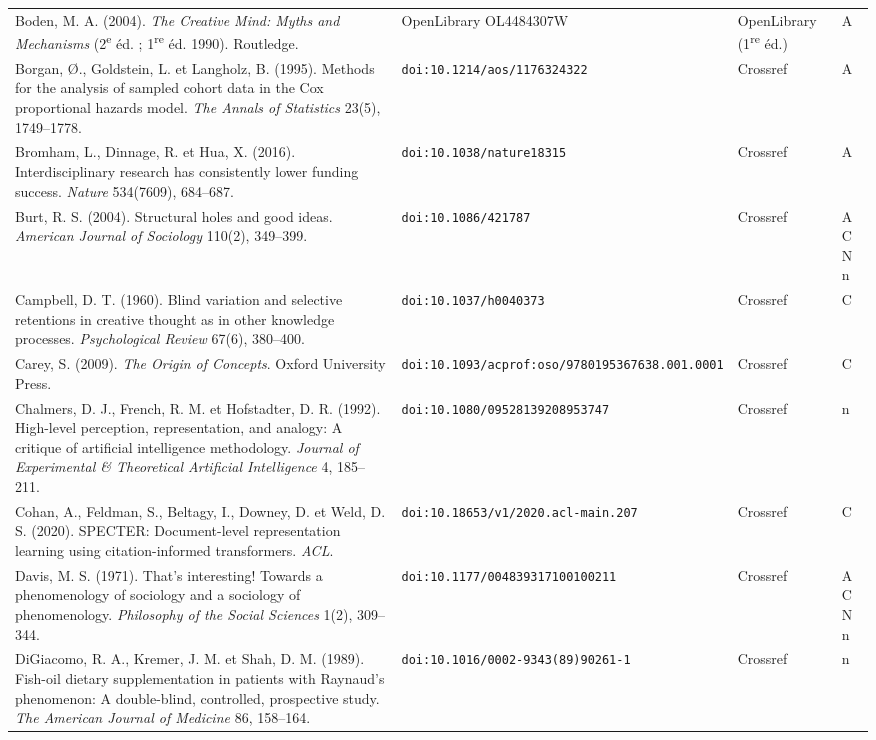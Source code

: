 \documentclass[a4paper,11pt]{article}
\begin{document}
{\begin{longtable}{@{}>{\raggedright\arraybackslash}p{8.7cm}>{\raggedright\arraybackslash}p{3.6cm}>{\raggedright\arraybackslash}p{2.1cm}>{\raggedright\arraybackslash}p{0.9cm}@{}}
Boden, M. A. (2004). \emph{The Creative Mind: Myths and Mechanisms} (2\textsuperscript{e} éd. ; 1\textsuperscript{re} éd. 1990). Routledge. & OpenLibrary OL4484307W & OpenLibrary (1\textsuperscript{re} éd.) & A\\
Borgan, Ø., Goldstein, L. et Langholz, B. (1995). Methods for the analysis of sampled cohort data in the Cox proportional hazards model. \emph{The Annals of Statistics} 23(5), 1749--1778. & \nolinkurl{doi:10.1214/aos/1176324322} & Crossref & A\\
Bromham, L., Dinnage, R. et Hua, X. (2016). Interdisciplinary research has consistently lower funding success. \emph{Nature} 534(7609), 684--687. & \nolinkurl{doi:10.1038/nature18315} & Crossref & A\\
Burt, R. S. (2004). Structural holes and good ideas. \emph{American Journal of Sociology} 110(2), 349--399. & \nolinkurl{doi:10.1086/421787} & Crossref & A C N n\\
Campbell, D. T. (1960). Blind variation and selective retentions in creative thought as in other knowledge processes. \emph{Psychological Review} 67(6), 380--400. & \nolinkurl{doi:10.1037/h0040373} & Crossref & C\\
Carey, S. (2009). \emph{The Origin of Concepts}. Oxford University Press. & \nolinkurl{doi:10.1093/acprof:oso/9780195367638.001.0001} & Crossref & C\\
Chalmers, D. J., French, R. M. et Hofstadter, D. R. (1992). High-level perception, representation, and analogy: A critique of artificial intelligence methodology. \emph{Journal of Experimental \& Theoretical Artificial Intelligence} 4, 185--211. & \nolinkurl{doi:10.1080/09528139208953747} & Crossref & n\\
Cohan, A., Feldman, S., Beltagy, I., Downey, D. et Weld, D. S. (2020). SPECTER: Document-level representation learning using citation-informed transformers. \emph{ACL}. & \nolinkurl{doi:10.18653/v1/2020.acl-main.207} & Crossref & C\\
Davis, M. S. (1971). That's interesting! Towards a phenomenology of sociology and a sociology of phenomenology. \emph{Philosophy of the Social Sciences} 1(2), 309--344. & \nolinkurl{doi:10.1177/004839317100100211} & Crossref & A C N n\\
DiGiacomo, R. A., Kremer, J. M. et Shah, D. M. (1989). Fish-oil dietary supplementation in patients with Raynaud's phenomenon: A double-blind, controlled, prospective study. \emph{The American Journal of Medicine} 86, 158--164. & \nolinkurl{doi:10.1016/0002-9343(89)90261-1} & Crossref & n\\

\end{longtable}}
\end{document}
